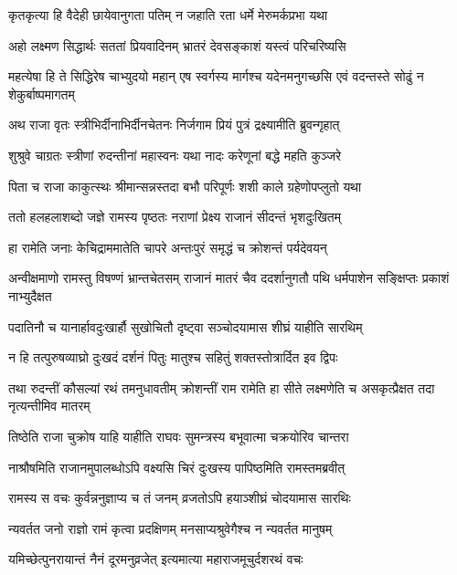 \twolineshloka
{कृतकृत्या हि वैदेही छायेवानुगता पतिम्}
{न जहाति रता धर्मे मेरुमर्कप्रभा यथा} %

\twolineshloka
{अहो लक्ष्मण सिद्धार्थः सततां प्रियवादिनम्}
{भ्रातरं देवसङ्काशं यस्त्वं परिचरिष्यसि} %

\threelineshloka
{महत्येषा हि ते सिद्धिरेष चाभ्युदयो महान्}
{एष स्वर्गस्य मार्गश्च यदेनमनुगच्छसि}
{एवं वदन्तस्ते सोढुं न शेकुर्बाष्पमागतम्} %

\twolineshloka
{अथ राजा वृतः स्त्रीभिर्दीनाभिर्दीनचेतनः}
{निर्जगाम प्रियं पुत्रं द्रक्ष्यामीति ब्रुवन्गृहात्} %

\twolineshloka
{शुश्रुवे चाग्रतः स्त्रीणां रुदन्तीनां महास्वनः}
{यथा नादः करेणूनां बद्धे महति कुञ्जरे} %

\twolineshloka
{पिता च राजा काकुत्स्थः श्रीमान्सन्नस्तदा बभौ}
{परिपूर्णः शशी काले ग्रहेणोपप्लुतो यथा} %

\twolineshloka
{ततो हलहलाशब्दो जज्ञे रामस्य पृष्ठतः}
{नराणां प्रेक्ष्य राजानं सीदन्तं भृशदुःखितम्} %

\twolineshloka
{हा रामेति जनाः केचिद्राममातेति चापरे}
{अन्तःपुरं समृद्धं च क्रोशन्तं पर्यदेवयन्} %

\threelineshloka
{अन्वीक्षमाणो रामस्तु विषण्णं भ्रान्तचेतसम्}
{राजानं मातरं चैव ददर्शानुगतौ पथि}
{धर्मपाशेन सङ्क्षिप्तः प्रकाशं नाभ्युदैक्षत} %

\twolineshloka
{पदातिनौ च यानार्हावदुःखार्हौ सुखोचितौ}
{दृष्ट्वा सञ्चोदयामास शीघ्रं याहीति सारथिम्} %

\twolineshloka
{न हि तत्पुरुषव्याघ्रो दुःखदं दर्शनं पितुः}
{मातुश्च सहितुं शक्तस्तोत्रार्दित इव द्विपः} %

\threelineshloka
{तथा रुदन्तीं कौसल्यां रथं तमनुधावतीम्}
{क्रोशन्तीं राम रामेति हा सीते लक्ष्मणेति च}
{असकृत्प्रैक्षत तदा नृत्यन्तीमिव मातरम्} %

\twolineshloka
{तिष्ठेति राजा चुक्रोष याहि याहीति राघवः}
{सुमन्त्रस्य बभूवात्मा चक्रयोरिव चान्तरा} %

\twolineshloka
{नाश्रौषमिति राजानमुपालब्धोऽपि वक्ष्यसि}
{चिरं दुःखस्य पापिष्ठमिति रामस्तमब्रवीत्} %

\twolineshloka
{रामस्य स वचः कुर्वन्ननुज्ञाप्य च तं जनम्}
{व्रजतोऽपि हयाञ्शीघ्रं चोदयामास सारथिः} %

\twolineshloka
{न्यवर्तत जनो राज्ञो रामं कृत्वा प्रदक्षिणम्}
{मनसाप्यश्रुवेगैश्च न न्यवर्तत मानुषम्} %

\twolineshloka
{यमिच्छेत्पुनरायान्तं नैनं दूरमनुव्रजेत्}
{इत्यमात्या महाराजमूचुर्दशरथं वचः} %

